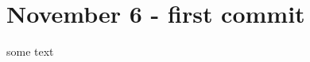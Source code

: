 \chapter{November 6 -\/ first commit}
\hypertarget{md_updates_2_november__6-first_01commit}{}\label{md_updates_2_november__6-first_01commit}
\label{md_updates_2_november__6-first_01commit_autotoc_md1}%
%
 some text 